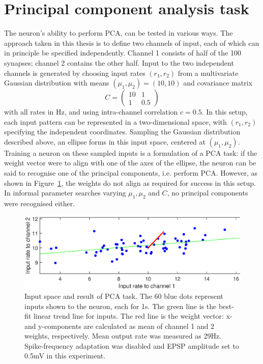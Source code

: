 \documentclass[a4paper,12pt]{report}
\theoremstyle{definition}
\begin{document}
\section{Principal component analysis task} %
\label{sec:pca}
The neuron's ability to perform PCA, can be tested in various ways. The approach taken in this thesis is to define two channels of input, each of which can in principle be specified independently. Channel 1 consists of half of the 100 synapses; channel 2 contains the other half. Input to the two independent channels is generated by choosing input rates $(r_1, r_2)$ from a multivariate Gaussian distribution with means $(\mu_1, \mu_2)=(10,10)$ and covariance matrix
$$
C =
\begin{pmatrix}
  10 & 1 \\
  1 & 0.5
 \end{pmatrix}
$$
with all rates in Hz, and using intra-channel correlation $c=0.5$. In this setup, each input pattern can be represented in a two-dimensional space, with $(r_1, r_2)$ specifying the independent coordinates. Sampling the Gaussian distribution described above, an ellipse forms in this input space, centered at $(\mu_1, \mu_2)$. Training a neuron on these sampled inputs is a formulation of a PCA task: if the weight vector were to align with one of the axes of the ellipse, the neuron can be said to recognise one of the principal components, i.e. perform PCA. However, as shown in Figure~\ref{fig:exp10_pca}, the weights do not align as required for success in this setup. In informal parameter searches varying $\mu_1, \mu_2$ and $C$, no principal components were recognised either.

\begin{figure}[!htb]
    \centering
    \includegraphics[width=\textwidth]{figures/exp10_pca.eps}
    \caption{Input space and result of PCA task. The 60 blue dots represent inputs shown to the neuron, each for 1s. The green line is the best-fit linear trend line for inputs. The red line is the weight vector: x- and y-components are calculated as mean of channel 1 and 2 weights, respectively. Mean output rate was measured as 29Hz. Spike-frequency adaptation was disabled and EPSP amplitude set to 0.5mV in this experiment.}
    \label{fig:exp10_pca}
\end{figure}
\end{document}

